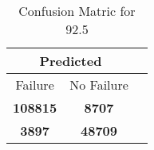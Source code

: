 \begin{table}[] 
\label{Table: Prediction Accuracy-DMD92.5OnlySunEKF-combinationReflection-Reflection} 
\caption{Confusion Matric for 92.5} 
\centering 
\begin{tabular} 
 {@{}ccc@{}} 
\toprule 
\multicolumn{2}{c}{\textbf{Predicted}}
 \\ \midrule 
\multicolumn{1}{|c|}{Failure} & 
\multicolumn{1}{c|}{No Failure}
 \\ \midrule 
\multicolumn{1}{|c|}{\color{green}\textbf{108815}} & 
\multicolumn{1}{c|}{\color{red}\textbf{8707}}
 \\ \midrule 
\multicolumn{1}{|c|}{\color{red}\textbf{3897}} & 
\multicolumn{1}{c|}{\color{green}\textbf{48709}}
 \\ \bottomrule 
\end{tabular} 
\end{table} 
